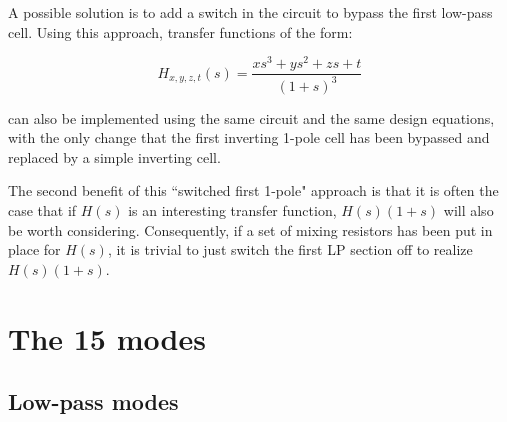 \documentclass[a4paper,10pt]{article}
\begin{document}
A possible solution is to add a switch in the circuit to bypass the first low-pass cell. Using this approach, transfer functions of the form:

$$H_{x, y, z, t}(s) = \frac{x s^3 + y s^2 + z s + t}{(1 + s)^3}$$

can also be implemented using the same circuit and the same design equations, with the only change that the first inverting 1-pole cell has been bypassed and replaced by a simple inverting cell.

The second benefit of this ``switched first 1-pole" approach is that it is often the case that if $H(s)$ is an interesting transfer function, $H(s) (1 + s)$ will also be worth considering. Consequently, if a set of mixing resistors has been put in place for $H(s)$, it is trivial to just switch the first LP section off to realize $H(s) (1 + s)$.

\section{The 15 modes}

\subsection{Low-pass modes}
\end{document}
